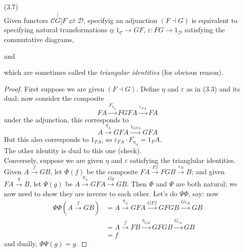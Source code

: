 \documentclass[a4paper]{article}
\begin{document}
\begin{thm} (3.7)\\
    Given functors $\mathcal{C} \stackrel[G]{F}{\rightleftarrows} \mathcal{D}$, specifyig an adjunction $(F \dashv G)$ is equivalent to specifying natural transformations $\eta: 1_{\mathcal{C}} \to GF$, $\varepsilon:FG \to 1_{\mathcal{D}}$ satisfying the commutative diagrams,

    and

    which are sometimes called the \emph{triangular identities} (for obvious reason).
    \begin{proof}
        First suppose we are given $(F \dashv G)$. Define $\eta$ and $\varepsilon$ as in (3.3) and its dual; now consider the composite
        $$FA \xrightarrow{F_{\eta_A}} FGFA \xrightarrow{\varepsilon_{FA}} FA$$
        under the adjunction, this corresponds to
        $$A \xrightarrow{\eta_A} GFA \xrightarrow{1_{GFA}} GFA$$
        But this also corresponds to $1_{FA}$, so $\varepsilon_{FA} \cdot F_{\eta_A} = 1_FA$.\\
        The other identity is dual to this one (check).\\
        Conversely, suppose we are given $\eta$ and $\varepsilon$ satisfying the trianglular identities. Given $A \xrightarrow{f} GB$, let $\Phi(f)$ be the composite $FA \xrightarrow{Ff} FGB \xrightarrow{\varepsilon_B} B$; and given $FA \xrightarrow{g} B$, let $\Psi(g)$ be $A \xrightarrow{\eta_A} GFA \xrightarrow{Gg} GB$. Then $\Phi$ and $\Psi$ are both natural; we now need to show they are inverse to each other. Let's do $\Psi\Phi$, say: now 
        \begin{equation*}
            \begin{aligned}
                \Psi\Phi(A \xrightarrow{f} GB) &= A \xrightarrow{\eta_A} GFA \xrightarrow{GFf} GFGB \xrightarrow{G\varepsilon_B} GB\\
                &= A \xrightarrow{f} FB \xrightarrow{\eta_{GB}} GFGB \xrightarrow{G_{\varepsilon_B}} GB\\
                &= f
            \end{aligned}
        \end{equation*}
        and dually, $\Phi\Psi(g) = g$.
    \end{proof}
\end{thm}
\end{document}
